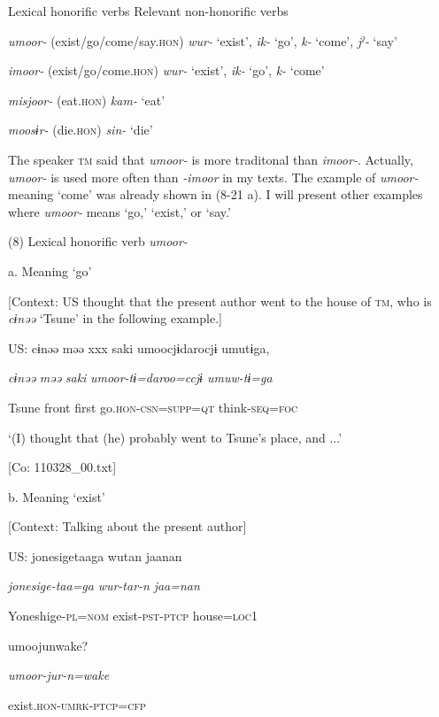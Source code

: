 Lexical honorific verbs  Relevant non-honorific verbs

\textit{umoor-} (exist/go/come/say.\textsc{hon})  \textit{wur-} ‘exist’, \textit{ik-} ‘go’, \textit{k-} ‘come’, \textit{jˀ-} ‘say’

\textit{imoor-} (exist/go/come.\textsc{hon})  \textit{wur-} ‘exist’, \textit{ik-} ‘go’, \textit{k-} ‘come’

\textit{misjoor-} (eat.\textsc{hon})  \textit{kam-} ‘eat’

\textit{moosɨr-} (die.\textsc{hon})  \textit{sin-} ‘die’

The speaker \textsc{tm} said that \textit{umoor-} is more traditonal than \textit{imoor-}. Actually, \textit{umoor-} is used more often than \textit{{}-imoor} in my texts. The example of \textit{umoor-} meaning ‘come’ was already shown in (8-21 a). I will present other examples where \textit{umoor-} means ‘go,’ ‘exist,’ or ‘say.’

(8)  Lexical honorific verb \textit{umoor-}

  a.  Meaning ‘go’

    [Context: US thought that the present author went to the house of \textsc{tm}, who is \textit{cɨnəə} ‘Tsune’ in the following example.]

    US:  cɨnəə  məə  xxx  saki  umoocjɨdarocjɨ  umutɨga,

      \textit{cɨnəə}  \textit{məə}    \textit{saki}  \textit{umoor{}-tɨ=daroo=ccjɨ  umuw-tɨ=ga}

      Tsune  front    first  go.\textsc{hon}-\textsc{csn}=\textsc{supp}=\textsc{qt}  think-\textsc{seq}=\textsc{foc}

      ‘(I) thought that (he) probably went to Tsune’s place, and ...’

      [Co: 110328\_00.txt]

  b.  Meaning ‘exist’

    [Context: Talking about the present author]

    US:  jonesigetaaga  wutan  jaanan  

      \textit{jonesige-taa=ga}  \textit{wur-tar-n}  \textit{jaa=nan}  

      Yoneshige-\textsc{pl}=\textsc{nom}  exist-\textsc{pst}-\textsc{ptcp}  house=\textsc{loc}1

      umoojunwake?

      \textit{umoor{}-jur-n=wake}

      exist.\textsc{hon}-\textsc{umrk}-\textsc{ptcp}=\textsc{cfp}

